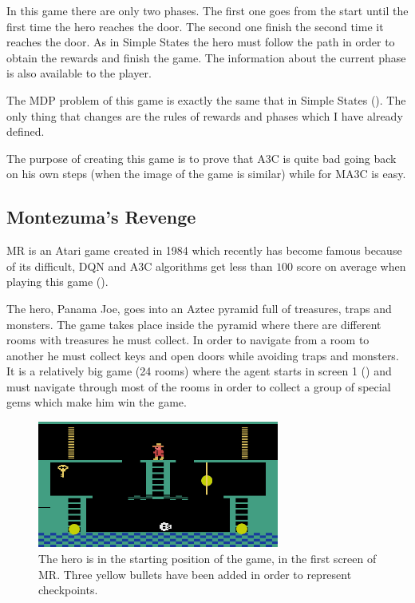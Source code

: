 In this game there are only two phases.
The first one goes from the start until the first time the hero reaches the door.
The second one finish the second time it reaches the door.
As in Simple States the hero must follow the path in order to obtain the rewards and finish the game.
The information about the current phase is also available to the player.

The \ac{MDP} problem of this game is exactly the same that in Simple States ().
The only thing that changes are the rules of rewards and phases which I have already defined.

The purpose of creating this game is to prove that \ac{A3C} is quite bad going back on his own steps (when the image of the
game is similar) while for \ac{MA3C} is easy.

\subsection{Montezuma's Revenge\label{subsec:MontezumasRevenge}}

\acf{MR} is an Atari game created in 1984 which recently has become famous because of its difficult,
\ac{DQN} and \ac{A3C} algorithms get less than $100$ score on average when playing this game (\cite{mnih2016A3C}).

The hero, Panama Joe, goes into an Aztec pyramid full of treasures, traps and monsters.
The game takes place inside the pyramid where there are different rooms with treasures he must collect.
In order to navigate from a room to another he must collect keys and open doors while avoiding traps and monsters.
It is a relatively big game (24 rooms) where the agent starts in screen 1 () and must navigate
through most of the rooms in order to collect a group of special gems which make him win the game.

\begin{figure}[hbtp]
\begin{center}
\includegraphics[width=300]{img/montezuma_checkpoints.png}
\end{center}
\caption[Montezuma's Revenge game]
{The hero is in the starting position of the game, in the first screen of \acl{MR}.
Three yellow bullets have been added in order to represent checkpoints.}
\label{fig:MontezumasRevenge}
\end{figure}

